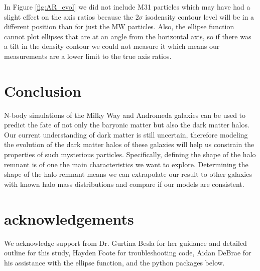 \documentclass[linenumbers, twocolumn]{aastex631}
\begin{document}
In Figure \ref{fig:AR_evol} we did not include M31 particles which may have had a slight effect on the axis ratios because the 2$\sigma$ isodensity contour level will be in a different position than for just the MW particles. 
Also, the ellipse function cannot plot ellipses that are at an angle from the horizontal axis, so if there was a tilt in the density contour we could not measure it which means our measurements are a lower limit to the true axis ratios.

\section{Conclusion}
N-body simulations of the Milky Way and Andromeda galaxies can be used to predict the fate of not only the baryonic matter but also the dark matter halos. 
Our current understanding of dark matter is still uncertain, therefore modeling the evolution of the dark matter halos of these galaxies will help us constrain the properties of such mysterious particles. 
Specifically, defining the shape of the halo remnant is of one the main characteristics we want to explore. 
Determining the shape of the halo remnant means we can extrapolate our result to other galaxies with known halo mass distributions and compare if our models are consistent.








\section{acknowledgements}
We acknowledge support from Dr. Gurtina Besla for her guidance and detailed outline for this study, Hayden Foote for troubleshooting code, Aidan DeBrae for his assistance with the ellipse function, and the python packages below. 


{}



\end{document}
